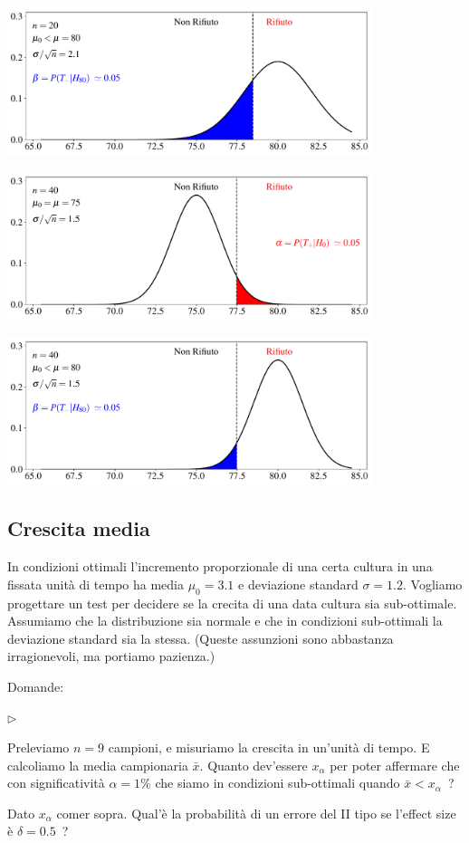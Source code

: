 \documentclass[12pt,openany]{book}
\newcommand{\mylabel}[1]{{\footnotesize\textsf{#1}}\hfill}
\renewenvironment{itemize}
  {\begin{list}{$\triangleright$}{%
   \setlength{\parskip}{0mm}
   \setlength{\topsep}{.2\baselineskip}
   \setlength{\rightmargin}{0mm}
   \setlength{\listparindent}{0mm}
   \setlength{\itemindent}{0mm}
   \setlength{\labelwidth}{3ex}
   \setlength{\itemsep}{.4\baselineskip}
   \setlength{\parsep}{0mm}
   \setlength{\partopsep}{0mm}
   \setlength{\labelsep}{1ex}
   \setlength{\leftmargin}{\labelwidth+\labelsep}
   \let\makelabel\mylabel}}{%
   \end{list}\vspace*{-1.3mm}}
\theoremstyle{mio}
\theoremstyle{liscio}
\begin{document}
\hfil\includegraphics[width=0.8\textwidth]{figure/Z-test_02.pdf}

\hfil\includegraphics[width=0.8\textwidth]{figure/Z-test_03.pdf}

\hfil\includegraphics[width=0.8\textwidth]{figure/Z-test_04.pdf}




\hfill{}\clearpage\subsection{Crescita media}

In condizioni ottimali l'incremento proporzionale di una certa cultura in una fissata unità di tempo ha media $\mu_0=3.1$ e deviazione standard $\sigma=1.2$. Vogliamo progettare un test per decidere se la crecita di una data cultura sia sub-ottimale. Assumiamo che la distribuzione sia normale e che in condizioni sub-ottimali la  deviazione standard sia la stessa. (Queste assunzioni sono abbastanza irragionevoli, ma portiamo pazienza.)

Domande:

\begin{itemize}
\item[1] Preleviamo $n=9$ campioni, e misuriamo la crescita in un'unità di tempo. E calcoliamo la media campionaria $\bar x$. Quanto dev'essere $x_\alpha$ per poter affermare che con significatività $\alpha=1\%$ che siamo in condizioni sub-ottimali quando $\bar x<x_\alpha$~?
\item[2] Dato $x_\alpha$ comer sopra. Qual'è la probabilità di un errore del II tipo se l'effect size è $\delta=0.5$~?
\end{itemize}
\end{document}
